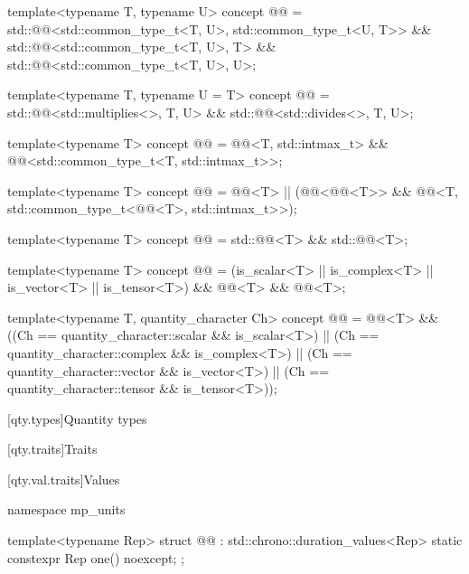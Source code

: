 \begin{itemdecl}
template<typename T, typename U>
concept @@ = std::@@<std::common_type_t<T, U>, std::common_type_t<U, T>> &&
                         std::@@<std::common_type_t<T, U>, T> &&
                         std::@@<std::common_type_t<T, U>, U>;

template<typename T, typename U = T>
concept @@ = std::@@<std::multiplies<>, T, U> &&
                         std::@@<std::divides<>, T, U>;

template<typename T>
concept @@ =
  @@<T, std::intmax_t> && @@<std::common_type_t<T, std::intmax_t>>;

template<typename T>
concept @@ =
  @@<T> ||
  (@@<@@<T>> &&
   @@<T, std::common_type_t<@@<T>, std::intmax_t>>);

template<typename T>
concept @@ = std::@@<T> && std::@@<T>;

template<typename T>
concept @@ = (is_scalar<T> || is_complex<T> || is_vector<T> || is_tensor<T>) &&
                         @@<T> && @@<T>;

template<typename T, quantity_character Ch>
concept @@ =
  @@<T> && ((Ch == quantity_character::scalar && is_scalar<T>) ||
                        (Ch == quantity_character::complex && is_complex<T>) ||
                        (Ch == quantity_character::vector && is_vector<T>) ||
                        (Ch == quantity_character::tensor && is_tensor<T>));
\end{itemdecl}

[qty.types]{Quantity types}

[qty.traits]{Traits}

[qty.val.traits]{Values}

\begin{codeblock}
namespace mp_units {

template<typename Rep>
struct @@ : std::chrono::duration_values<Rep> {
  static constexpr Rep one() noexcept;
};

}
\end{codeblock}

